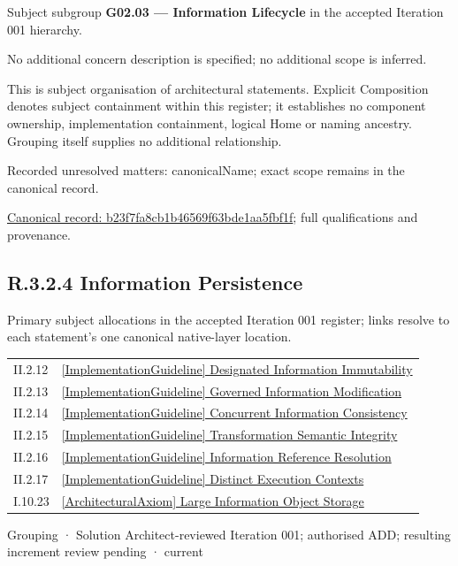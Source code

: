 Subject subgroup \textbf{G02.03 — Information Lifecycle} in the accepted Iteration 001 hierarchy.



No additional concern description is specified; no additional scope is inferred.



This is subject organisation of architectural statements. Explicit Composition denotes subject containment within this register; it establishes no component ownership, implementation containment, logical Home or naming ancestry. Grouping itself supplies no additional relationship.


{\small Recorded unresolved matters: canonicalName; exact scope remains in the canonical record.}\par
{\footnotesize \href{../../../../continuum/grouping/b23f7fa8cb1b46569f63bde1aa5fbf1f.md}{Canonical record: b23f7fa8cb1b46569f63bde1aa5fbf1f}; full qualifications and provenance.}\par
\subsection*{R.3.2.4 Information Persistence}
\label{navigation:R.3.2.4}

Primary subject allocations in the accepted Iteration 001 register; links resolve to each statement’s one canonical native-layer location.\par
\begin{longtable}{p{.22\linewidth}p{.73\linewidth}}
II.2.12 & \hyperref[element:f9ac3424852f4c30b5b152c7a007c704]{[ImplementationGuideline] Designated Information Immutability} \\
II.2.13 & \hyperref[element:d08bf41d719c43e3bc1a54bd79d95741]{[ImplementationGuideline] Governed Information Modification} \\
II.2.14 & \hyperref[element:0b0be077a4d449e29d72048634e276e4]{[ImplementationGuideline] Concurrent Information Consistency} \\
II.2.15 & \hyperref[element:45c752faef034d3eb04ef6580f1dcc97]{[ImplementationGuideline] Transformation Semantic Integrity} \\
II.2.16 & \hyperref[element:b5c3dcfd6ece40fdb6c8694924db2ae6]{[ImplementationGuideline] Information Reference Resolution} \\
II.2.17 & \hyperref[element:d0af3f7b7f9947008b3b066eefe73617]{[ImplementationGuideline] Distinct Execution Contexts} \\
I.10.23 & \hyperref[element:06ac0b10e0614c5cb33499c1e6c4edc7]{[ArchitecturalAxiom] Large Information Object Storage} \\
\end{longtable}
\label{element:8b7fd22a55434e5ca3e7ba87afb020d6}
{\small Grouping · Solution Architect-reviewed Iteration 001; authorised ADD; resulting increment review pending · current}\par


